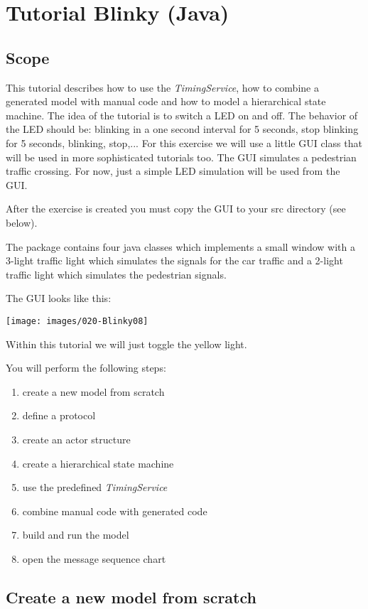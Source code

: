\chapter{Tutorial Blinky (Java)}

\section{Scope}

This tutorial describes how to use the \textit{TimingService}, how to combine a generated model with manual code and how to model a hierarchical state machine. The idea of the tutorial is to switch a LED on and off. The behavior of the LED should be: blinking in a one second interval for 5 seconds, stop blinking for 5 seconds, blinking, stop,...  
For this exercise we will use a little GUI class that will be used in more sophisticated tutorials too. The GUI simulates a pedestrian traffic crossing. For now, just a simple LED simulation will be used from the GUI. 

After the exercise is created you must copy the GUI to your src directory (see below).

The package contains four java classes which implements a small window with a 3-light traffic light which simulates the signals for the car traffic and a 2-light traffic light which simulates the pedestrian signals.

The GUI looks like this:

\texttt{[image: images/020-Blinky08]}

Within this tutorial we will just toggle the yellow light.

You will perform the following steps:

\begin{enumerate}
\item create a new model from scratch
\item define a protocol
\item create an actor structure
\item create a hierarchical state machine
\item use the predefined \textit{TimingService}
\item combine manual code with generated code
\item build and run the model
\item open the message sequence chart
\end{enumerate}

\section{Create a new model from scratch}

